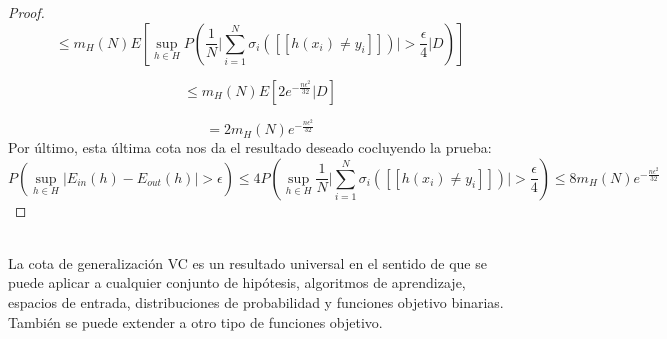 \begin{proof}
\[ \leq m_{H}(N) E \left[ \sup_{h \in H} P \left( \frac{1}{N} \bigg\vert \sum_{i=1}^{N} \sigma_{i} ( [[ h(x_{i}) \neq y_{i} ]])\bigg\vert > \frac{\epsilon}{4} \bigg\vert D \right) \right] \]

\[\leq m_{H}(N) E \left[ 2 e^{ -\frac{ n\epsilon^{2} }{ 32 } } \vert D \right] \]

\[ = 2 m_{H}(N)e^{ -\frac{ n\epsilon^{2} }{ 32 } } \]
Por último, esta última cota nos da el resultado deseado cocluyendo la prueba:
\[ P \left( \sup_{h \in H} \vert E_{in}(h)-E_{out}(h) \vert >\epsilon \right) \leq 4P \left( \sup_{h \in H} \frac{1}{N} \bigg\vert \sum_{i=1}^{N} \sigma_{i} ( [[ h(x_{i}) \neq y_{i} ]])\bigg\vert > \frac{\epsilon}{4} \right) \leq 8 m_{H}(N)e^{ -\frac{ n\epsilon^{2} }{ 32 } } \]
\end{proof} \cite{VCboundRNowak}\\
La cota de generalización VC es un resultado universal en el sentido de que se puede aplicar a cualquier conjunto de hipótesis, algoritmos de aprendizaje, espacios de entrada, distribuciones de probabilidad y funciones objetivo binarias. También se puede extender a otro tipo de funciones objetivo. \cite{abu2012learning}
